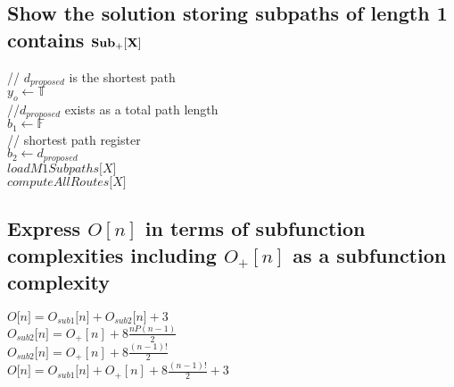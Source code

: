 \documentclass[11pt]{article}
\begin{document}
\subsection{Show the solution storing subpaths of length 1 contains $\bold{Sub_+[X]}$}
\begin{center}
\vspace{4mm}
// $d_{proposed}$ is the shortest path\\
$y_o \leftarrow \mathbb{T}$
\\ \vspace{3mm}
//$d_{proposed}$ exists as a total path length\\
$ b_1 \leftarrow \mathbb{F}$
\\ \vspace{3mm}
// shortest path register\\
$ b_2 \leftarrow d_{proposed}$
\\ \vspace{3mm}
$loadM1Subpaths\lbrack X\rbrack$
\\ \vspace{1mm}
$computeAllRoutes\lbrack X \rbrack$
\end{center}








\subsection{Express $O[n]$ in terms of subfunction complexities including $O_+[n]$ as a subfunction complexity}
\begin{center}
$
O\lbrack n \rbrack = O_{sub1}\lbrack n \rbrack + O_{sub2}\lbrack n \rbrack + 3
$
\\ \vspace{2mm}
$
 O_{sub2}\lbrack n \rbrack = O_+[n] + 8\frac{nP(n-1)}{2}
$
\\ \vspace{2mm}
$
 O_{sub2}\lbrack n \rbrack = O_+[n] + 8\frac{(n-1)!}{2}
$
\\ \vspace{2mm}
$
O\lbrack n \rbrack = O_{sub1}\lbrack n \rbrack + O_+[n] + 8\frac{(n-1)!}{2} + 3
$
\end{center}
\end{document}

